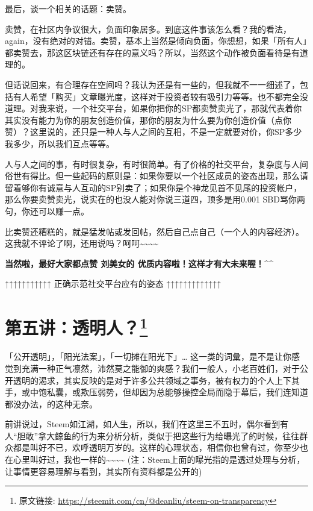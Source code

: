 \documentclass[]{ctexbook}
\begin{document}
最后，谈一个相关的话题：卖赞。

卖赞，在社区内争议很大，负面印象居多。到底这件事该怎么看？我的看法，again，没有绝对的对错。卖赞，基本上当然是倾向负面，你想想，如果「所有人」都卖赞去，那这区块链还有存在的意义吗？所以，当然这个动作被负面看待是有道理的。

但话说回来，有合理存在空间吗？我认为还是有一些的，但我就不一一细述了，包括有人希望「购买」文章曝光度，这样对于投资者较有吸引力等等。也不都完全没道理。对我来说，一个社交平台，如果你把你的SP都卖赞卖光了，那就代表着你其实没有能力为你的朋友创造价值，那你的朋友为什么要为你创造价值（点你赞）？这里说的，还只是一种人与人之间的互相，不是一定就要对价，你SP多少我多少，所以我们互点等等。

人与人之间的事，有时很复杂，有时很简单。有了价格的社交平台，复杂度与人间俗世有得比。但一些起码的原则是：如果你要以一个社区成员的姿态出现，那么请留着够你有诚意与人互动的SP别卖了；如果你是个神龙见首不见尾的投资帐户，那么你要卖赞卖光，说实在的也没人能对你说三道四，顶多是用0.001 SBD骂你两句，你还可以赚一点。

比卖赞还糟糕的，就是猛发帖或发回帖，然后自己点自己（一个人的内容经济）。这我就不评论了啊，还用说吗？呵呵\textasciitilde{}\textasciitilde{}\textasciitilde{}\textasciitilde{}

\textbf{当然啦，最好大家都点赞 刘美女的 优质内容啦！这样才有大未来喔！\^{}\^{}}

↑↑↑↑↑↑↑↑↑↑↑ 正确示范社交平台应有的姿态 ↑↑↑↑↑↑↑↑↑↑↑↑↑

\hypertarget{deanliu5}{%
\section[第五讲：透明人？]{\texorpdfstring{第五讲：透明人？\footnote{原文链接: \url{https://steemit.com/cn/@deanliu/steem-on-transparency}}}{第五讲：透明人？}}\label{deanliu5}}

「公开透明」，「阳光法案」，「一切摊在阳光下」\ldots{} 这一类的词彙，是不是让你感觉到充满一种正气凛然，沛然莫之能御的爽感？我们一般人，小老百姓们，对于公开透明的渴求，其实反映的是对于许多公共领域之事务，被有权力的个人上下其手，或中饱私囊，或欺压弱势，但却因为总能够操控全局而隐于幕后，我们连知道都没办法，的这种无奈。

前讲说过，Steem如江湖，如人生，所以，我们在这里三不五时，偶尔看到有人``胆敢''拿大鲸鱼的行为来分析分析，类似于把这些行为给曝光了的时候，往往群众都是叫好不已，欢呼透明万岁的。这样的心理状态，相信你也曾有过，你至少也在心里叫好过，我也一样的\textasciitilde{}\textasciitilde{}\textasciitilde{}\textasciitilde{} (注：Steem上面的曝光指的是透过处理与分析，让事情更容易理解与看到，其实所有资料都是公开的)
\end{document}
